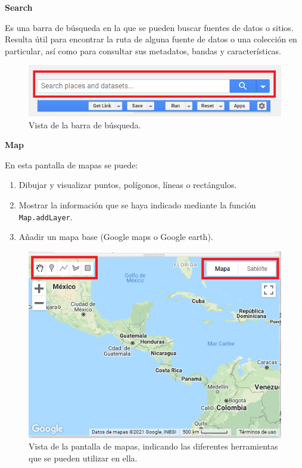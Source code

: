 \documentclass[
  12pt,
  letterpaper,
  twoside]{book}
\providecommand{\tightlist}{%
  \setlength{\itemsep}{0pt}\setlength{\parskip}{0pt}}
\begin{document}
\textbf{Search}

Es una barra de búsqueda en la que se pueden buscar fuentes de datos o sitios. Resulta útil para encontrar la ruta de alguna fuente de datos o una colección en particular, así como para consultar sus metadatos, bandas y características.

\begin{figure}

{\centering \includegraphics[width=0.8\linewidth]{Img/search} 

}

\caption{Vista de la barra de búsqueda.}\label{fig:unnamed-chunk-18}
\end{figure}

\textbf{Map}

En esta pantalla de mapas se puede:

\begin{enumerate}
\def\labelenumi{\arabic{enumi}.}
\tightlist
\item
  Dibujar y visualizar puntos, polígonos, líneas o rectángulos.
\item
  Mostrar la información que se haya indicado mediante la función \texttt{Map.addLayer}.
\item
  Añadir un mapa base (Google maps o Google earth).
\end{enumerate}

\begin{figure}

{\centering \includegraphics[width=0.8\linewidth]{Img/drawing} 

}

\caption{Vista de la pantalla de mapas, indicando las diferentes herramientas que se pueden utilizar en ella.}\label{fig:unnamed-chunk-19}
\end{figure}
\end{document}

